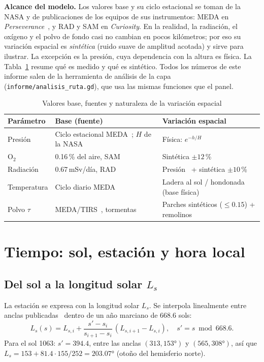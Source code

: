 \documentclass[conference]{IEEEtran}
\begin{document}
\textbf{Alcance del modelo.} Los valores base y su ciclo estacional se toman de la NASA y de publicaciones de los equipos de sus instrumentos: MEDA en \emph{Perseverance}~\cite{rodriguezmanfredi2021,nasa_instrumentos}, y RAD y SAM en \emph{Curiosity}. En la realidad, la radiación, el oxígeno y el polvo de fondo casi no cambian en pocos kilómetros; por eso su variación espacial es \emph{sintética} (ruido suave de amplitud acotada) y sirve para ilustrar. La excepción es la presión, cuya dependencia con la altura es física. La Tabla~\ref{tab:fuentes} resume qué es medido y qué es sintético. Todos los números de este informe salen de la herramienta de análisis de la capa (\texttt{informe/analisis\_ruta.gd}), que usa las mismas funciones que el panel.

\begin{table}[t]
\caption{Valores base, fuentes y naturaleza de la variación espacial}
\label{tab:fuentes}
\centering\small
\begin{tabular}{@{}p{1.25cm}p{3.05cm}p{3.0cm}@{}}
\toprule
Parámetro & Base (fuente) & Variación espacial \\ \midrule
Presión & Ciclo estacional MEDA~\cite{harri2024}; $H$ de la NASA~\cite{nasa_glenn,nasa_factsheet} & Física: $e^{-h/H}$ \\
O$_2$ & 0.16\,\% del aire, SAM~\cite{trainer2019,nasa_sam2019} & Sintética $\pm12$\,\% \\
Radiación & 0.67\,mSv/día, RAD~\cite{hassler2014,nasa_rad2013} & Presión~\cite{guo2017} + sintética $\pm10$\,\% \\
Temperatura & Ciclo diario MEDA~\cite{munguira2023,rodriguezmanfredi2021} & Ladera al sol / hondonada (base física) \\
Polvo $\tau$ & MEDA/TIRS~\cite{smith2023}, tormentas~\cite{sanchezlavega2025} & Parches sintéticos ($\le0.15$) + remolinos~\cite{hueso2023,toledo2023,jackson2021,nasa_winds2022} \\
\bottomrule
\end{tabular}
\end{table}

\section{Tiempo: sol, estación y hora local}
\subsection{Del sol a la longitud solar $L_s$}
La estación se expresa con la longitud solar $L_s$. Se interpola linealmente entre anclas publicadas~\cite{harri2024,sanchezlavega2025} dentro de un año marciano de 668.6 sols:
\begin{equation}
L_s(s) = L_{s,i} + \frac{s' - s_i}{s_{i+1}-s_i}\,(L_{s,i+1}-L_{s,i}),\quad s' = s \bmod 668.6 .
\end{equation}
Para el sol 1063: $s' = 394.4$, entre las anclas $(313, 153°)$ y $(565, 308°)$, así que $L_s = 153 + 81.4\cdot 155/252 = \mathbf{203.07°}$ (otoño del hemisferio norte).
\end{document}

